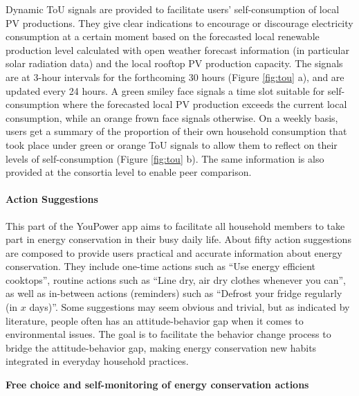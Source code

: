 Dynamic ToU signals are provided to facilitate users' self-consumption of local PV productions.
They give clear indications to encourage or discourage electricity consumption at a certain moment based on the forecasted local renewable production level calculated with open weather forecast information (in particular solar radiation data) and the local rooftop PV production capacity. 
The signals are at 3-hour intervals for the forthcoming 30 hours (Figure \ref{fig:tou} a), and are updated every 24 hours. A green smiley face signals a time slot suitable for self-consumption where the forecasted local PV production exceeds the current local consumption, while an orange frown face signals otherwise.  
% 
On a weekly basis, users get a summary of the proportion of their own household consumption that took place under green or orange ToU signals to allow them to reflect on their levels of self-consumption (Figure \ref{fig:tou} b). The same information is also provided at the consortia level to enable peer comparison. 


\paragraph{Action Suggestions}

This part of the YouPower app aims to %
facilitate all household members to take part in energy conservation in their busy daily life. 
% 
About fifty action suggestions are composed to provide users practical and accurate information about energy conservation. 
They include one-time actions such as ``Use energy efficient cooktops'', routine actions such as ``Line dry, air dry clothes whenever you can'', as well as in-between actions (reminders) such as ``Defrost your fridge regularly (in $x$ days)''. 
Some suggestions may seem obvious and trivial, but as indicated by literature, people often has an attitude-behavior gap when it comes to environmental issues. The goal is to facilitate the behavior change process to bridge the attitude-behavior gap, making energy conservation new habits integrated in everyday household practices. 

\textbf{Free choice and self-monitoring of energy conservation actions}

